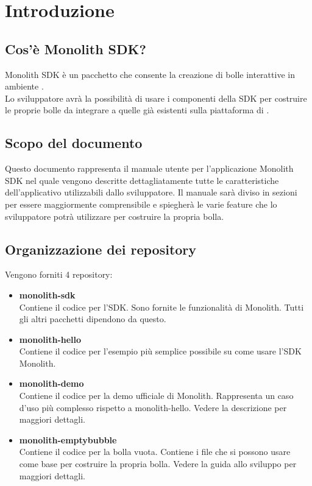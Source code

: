\section{Introduzione}
\subsection{Cos'è Monolith SDK?}
Monolith SDK è un pacchetto  che consente la creazione di bolle interattive in ambiente .\\
Lo sviluppatore avrà la possibilità di usare i componenti della SDK per costruire le proprie bolle da integrare a quelle già esistenti sulla piattaforma di .
\subsection{Scopo del documento}
Questo documento rappresenta il manuale utente per l'applicazione Monolith SDK nel quale vengono descritte dettagliatamente tutte le caratteristiche dell'applicativo utilizzabili dallo sviluppatore.
Il manuale sarà diviso in sezioni per essere maggiormente comprensibile e spiegherà le varie feature che lo sviluppatore potrà utilizzare per costruire la propria bolla.
\subsection{Organizzazione dei repository}
Vengono forniti 4 repository:
\begin{itemize}
	\item \textbf{monolith-sdk} \\
	Contiene il codice per l'SDK. Sono fornite le funzionalità di Monolith. Tutti gli altri pacchetti dipendono da questo. \\
	\url{}
	\item \textbf{monolith-hello} \\
	Contiene il codice per l'esempio più semplice possibile su come usare l'SDK Monolith. \\
	\url{}
	\item \textbf{monolith-demo} \\
	Contiene il codice per la demo ufficiale di Monolith. Rappresenta un caso d'uso più complesso rispetto a monolith-hello. Vedere la descrizione per maggiori dettagli. \\
	\url{}
	\item \textbf{monolith-emptybubble} \\
	Contiene il codice per la bolla vuota. Contiene i file che si possono usare come base per costruire la propria bolla. Vedere la guida allo sviluppo per maggiori dettagli. \\
	\url{}
\end{itemize}

